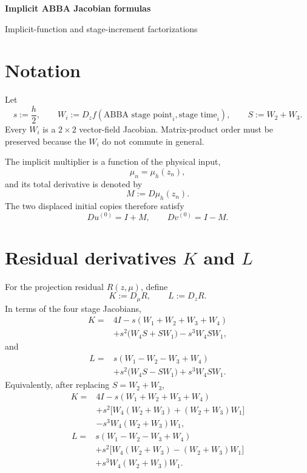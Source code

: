\documentclass[11pt,a4paper]{article}
\newcommand{\Id}{I}
\begin{document}
\begin{center}
  {\LARGE\bfseries\color{heading}Implicit ABBA Jacobian formulas}\par
  \vspace{0.35em}
  {\large Implicit-function and stage-increment factorizations}
\end{center}

\section{Notation}

Let
\[
 s:=\frac h2,
 \qquad
 W_i:=D_zf(\text{ABBA stage point}_i,\text{stage time}_i),
 \qquad
 S:=W_2+W_3.
\]
Every $W_i$ is a $2\times2$ vector-field Jacobian. Matrix-product order must be
preserved because the $W_i$ do not commute in general.

The implicit multiplier is a function of the physical input,
\[
 \mu_n=\mu_h(z_n),
\]
and its total derivative is denoted by
\[
 \boxed{M:=D\mu_h(z_n).}
\]
The two displaced initial copies therefore satisfy
\[
 Du^{(0)}=\Id+M,
 \qquad
 Dv^{(0)}=\Id-M.
\]

\section{Residual derivatives \texorpdfstring{$K$}{K} and \texorpdfstring{$L$}{L}}

For the projection residual $R(z,\mu)$, define
\[
 K:=D_\mu R,
 \qquad
 L:=D_zR.
\]
In terms of the four stage Jacobians,
\[
 \boxed{
 \begin{aligned}
 K={}&4\Id
 -s(W_1+W_2+W_3+W_4)\\
 &+s^2\bigl(W_4S+SW_1\bigr)
 -s^3W_4SW_1,
 \end{aligned}
 }
\]
and
\[
 \boxed{
 \begin{aligned}
 L={}&s(W_1-W_2-W_3+W_4)\\
 &+s^2\bigl(W_4S-SW_1\bigr)
 +s^3W_4SW_1.
 \end{aligned}
 }
\]
Equivalently, after replacing $S=W_2+W_3$,
\[
 \begin{aligned}
 K={}&4\Id-s(W_1+W_2+W_3+W_4)\\
 &+s^2\bigl[W_4(W_2+W_3)+(W_2+W_3)W_1\bigr]\\
 &-s^3W_4(W_2+W_3)W_1,
 \end{aligned}
\]
\[
 \begin{aligned}
 L={}&s(W_1-W_2-W_3+W_4)\\
 &+s^2\bigl[W_4(W_2+W_3)-(W_2+W_3)W_1\bigr]\\
 &+s^3W_4(W_2+W_3)W_1.
 \end{aligned}
\]
\end{document}

